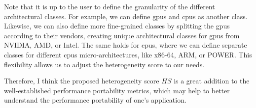 Note that it is up to the user to define the granularity of the different architectural classes. 
For example, we can define \glspl{gpu} and \glspl{cpu} as another class. 
Likewise, we can also define more fine-grained classes by splitting the \glspl{gpu} according to their vendors, creating unique architectural classes for \glspl{gpu} from NVIDIA, AMD, or Intel. 
The same holds for \glspl{cpu}, where we can define separate classes for different \glspl{cpu} micro-architectures, like x86-64, ARM, or POWER. 
This flexibility allows us to adjust the heterogeneity score to our needs. 

Therefore, I think the proposed heterogeneity score $HS$ is a great addition to the well-established performance portability metrics, which may help to better understand the performance portability of one's application. 
